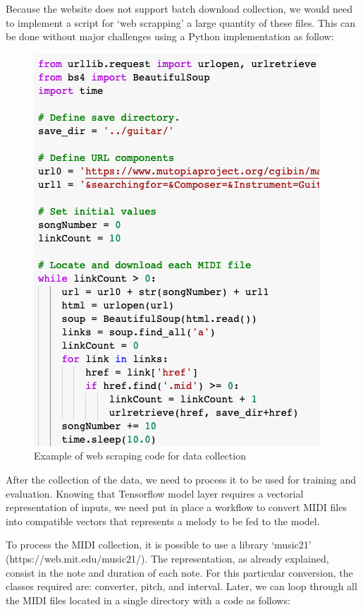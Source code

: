 Because the website does not support batch download collection, we would need to implement
a script for ‘web scrapping’ a large quantity of these files. This can be done without
major challenges using a Python implementation as follow:

\begin{figure}[h!]
  \includegraphics[width=\linewidth]{image/fig_JDF16.png}
  \caption{Example of web scraping code for data collection }
\end{figure}


After the collection of the data, we need to process it to be used for training and
evaluation. Knowing that Tensorflow model layer requires a vectorial representation of
inputs, we need put in place a workflow to convert MIDI files into compatible vectors that
represents a melody to be fed to the model.

To process the MIDI collection, it is possible to use a library ‘music21’
(https://web.mit.edu/music21/). The representation, as already explained, consist in the
note and duration of each note. For this particular conversion, the classes required are:
converter, pitch, and interval. Later, we can loop through all the MIDI files located in a
single directory with a code as follows:

